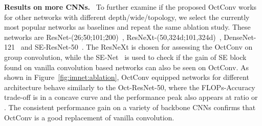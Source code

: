 \documentclass[10pt,twocolumn,letterpaper]{article}
\newcommand{\hiConvPrefix}[0]{Oct\xspace}
\newcommand{\hiConv}[0]{OctConv\xspace}
\newcommand{\myparagraph}[1]{\vspace{1pt}\noindent\textbf{#1.}~}
\begin{document}
\begin{table}[t]
\vspace{-1.5em}
\centering
\renewcommand{\arraystretch}{1.2}
\vspace{-8pt}
\caption{Results of ResNet-50. Inference time is measured on Intel Skylake CPU at 2.0 GHz (single thread). We report Intel(R) Math Kernel Library for Deep Neural Networks v0.18.1 (MKLDNN)~\cite{mkldnn} inference time for vanila ResNet-50. Because vanilla ResNet-50 is well optimized by Intel, we also show MKLDNN results as additional performance baseline. \hiConv networks are compiled by TVM~\cite{tvm} v0.5.}
\label{tab:hiconv:res50-cpu}
\end{table}

\myparagraph{Results on more CNNs}
To further examine if the proposed \hiConv works for other networks with different depth/wide/topology, we select the currently most popular networks as baselines and repeat the same ablation study. These networks are ResNet-(26;50;101;200)~\cite{ResNetV2}, ResNeXt-(50,324d;101,324d)~\cite{ResNeXt}, DenseNet-121~\cite{densenet} and SE-ResNet-50~\cite{SENet}. The ResNeXt is chosen for assessing the \hiConv on group convolution, while the SE-Net~\cite{SENet} is used to check if the gain of SE block found on vanilla convolution based networks can also be seen on \hiConv. As shown in Figure~\ref{fig:imnet:ablation}, \hiConv equipped networks for different architecture behave similarly to the \hiConvPrefix-ResNet-50, where the FLOPs-Accuracy trade-off is in a concave curve and the performance peak also appears at ratio  or . The consistent performance gain on a variety of backbone CNNs confirms that \hiConv is a good replacement of vanilla convolution.  
\end{document}
